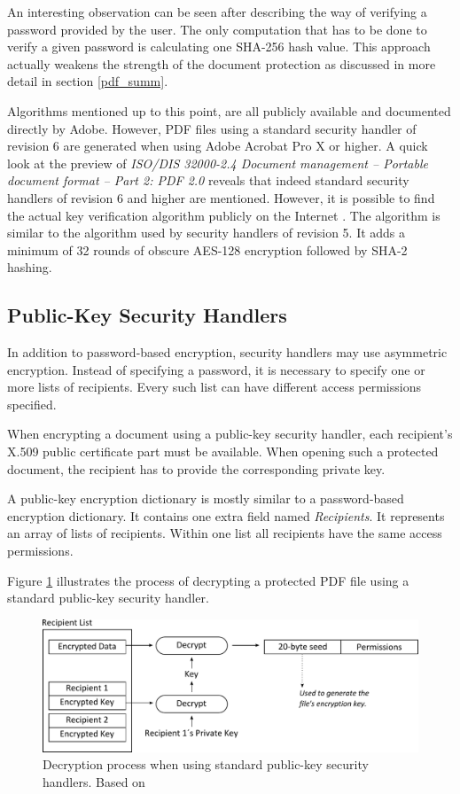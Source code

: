 \documentclass[11pt,oneside]{fithesis2}
\begin{document}
An interesting observation can be seen after describing the way of verifying a password provided by the user. The only computation that has to be done to verify a given password is calculating one SHA-256 hash value. This approach actually weakens the strength of the document protection as discussed in more detail in section \ref{pdf_summ}.

Algorithms mentioned up to this point, are all publicly available and documented directly by Adobe. However, PDF files using a standard security handler of revision 6 are generated when using Adobe Acrobat Pro X or higher. A quick look at the preview of \textit{ISO/DIS 32000-2.4 Document management -- Portable document format -- Part 2: PDF 2.0} reveals that indeed standard security handlers of revision 6 and higher are mentioned. However, it is possible to find the actual key verification algorithm publicly on the Internet \cite{esec_lab}. The algorithm is similar to the algorithm used by security handlers of revision 5. It adds a minimum of 32 rounds of obscure AES-128 encryption followed by SHA-2 hashing.

\subsection{Public-Key Security Handlers}

In addition to password-based encryption, security handlers may use asymmetric encryption. Instead of specifying a password, it is necessary to specify one or more  lists of recipients. Every such list can have different access permissions specified. 

When encrypting a document using a public-key security handler, each recipient's X.509 public certificate part must be available. When opening such a protected document, the recipient has to provide the corresponding private key.

A public-key encryption dictionary is mostly similar to a password-based encryption dictionary. It contains one extra field named \textit{Recipients}. It represents an array of lists of recipients. Within one list all recipients have the same access permissions. 

Figure \ref{public_key_alg} illustrates the process of decrypting a protected PDF file using a standard public-key security handler.

\begin{figure}[ht]
	\centering
	\includegraphics[width=1\textwidth]{figures/public_key_alg.pdf}
	\caption{Decryption process when using standard public-key security handlers. Based on \cite[p. 130]{pdf_spec}}
	\label{public_key_alg}
\end{figure}
\end{document}
